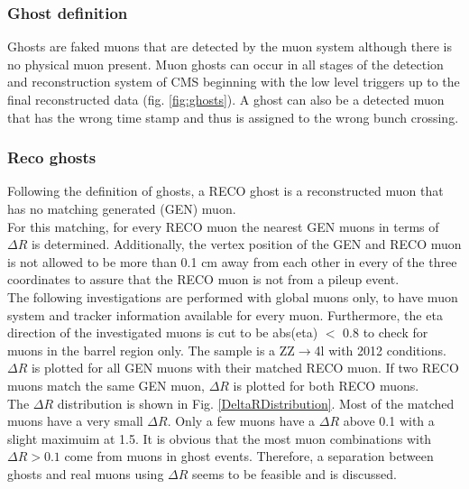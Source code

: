 \subsubsection{Ghost definition}
Ghosts are faked muons that are detected by the muon system although there is no physical muon present.
Muon ghosts can occur in all stages of the detection and reconstruction system of CMS beginning with the low level triggers up to the final reconstructed data (fig. \ref{fig:ghosts}).
A ghost can also be a detected muon that has the wrong time stamp and thus is assigned to the wrong bunch crossing.

\subsubsection{Reco ghosts}
Following the definition of ghosts, a RECO ghost is a reconstructed muon that has no matching generated (GEN) muon.\\
For this matching, for every RECO muon the nearest GEN muons in terms of $\Delta R$ is determined. Additionally, the vertex position of the GEN and RECO muon is not allowed to be more than 0.1 cm away from each other in every of the three coordinates to assure that the RECO muon is not from a pileup event.\\
The following investigations are performed with global muons only, to have muon system and tracker information available for every muon. Furthermore, the eta direction of the investigated muons is cut to be abs(eta) $<$ 0.8 to check for muons in the barrel region only. The sample is a ZZ$\to$4l with 2012 conditions.\\
$\Delta R$ is plotted for all GEN muons with their matched RECO muon. If two RECO muons match the same GEN muon, $\Delta R$ is plotted for both RECO muons.\\
The $\Delta R$ distribution is shown in Fig. \ref{DeltaRDistribution}. Most of the matched muons have a very small $\Delta R$. Only a few muons have a $\Delta R$ above 0.1 with a slight maximuim at 1.5. It is obvious that the most muon combinations with $\Delta R > 0.1$ come from muons in ghost events. Therefore, a separation between ghosts and real muons using $\Delta R$ seems to be feasible and is discussed.\\
